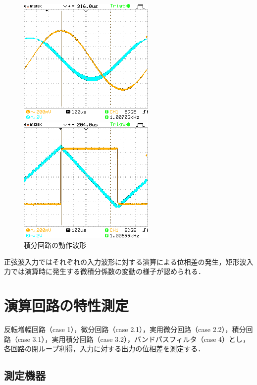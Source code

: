 \documentclass[dvipdfmx,titlepage,a4j]{jsarticle}  %
\begin{document}
\begin{figure}[H]
  \centering
  \begin{minipage}{8cm}
    \centering
    \includegraphics[keepaspectratio, scale=0.8]{../image/DS0002.png}
  \end{minipage}
  \begin{minipage}{8cm}
    \centering
    \includegraphics[keepaspectratio, scale=0.8]{../image/DS0003.png}
  \end{minipage}
  \caption{積分回路の動作波形}
  \label{fig:oc:case3}
\end{figure}

正弦波入力ではそれぞれの入力波形に対する演算による位相差の発生，矩形波入力では演算時に発生する微積分係数の変動の様子が認められる．

\section{演算回路の特性測定}
反転増幅回路（case 1），微分回路（case 2.1），実用微分回路（case 2.2），積分回路（case 3.1），実用積分回路（case 3.2），バンドパスフィルタ（case 4）とし，
各回路の閉ループ利得，入力に対する出力の位相差を測定する． 

\subsection{測定機器}
\end{document}
